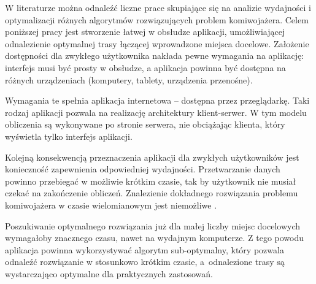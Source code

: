 W literaturze można odnaleźć liczne prace skupiające się na analizie wydajności i optymalizacji różnych algorytmów rozwiązujących problem komiwojażera. Celem poniższej pracy jest stworzenie łatwej w obsłudze aplikacji, umożliwiającej odnalezienie optymalnej trasy łączącej wprowadzone miejsca docelowe. Założenie dostępności dla zwykłego użytkownika nakłada pewne wymagania na aplikację: interfejs musi być prosty w obsłudze, a aplikacja powinna być dostępna na różnych urządzeniach (komputery, tablety, urządzenia przenośne).

Wymagania te spełnia aplikacja internetowa -- dostępna przez przeglądarkę. Taki rodzaj aplikacji pozwala na realizację architektury klient-serwer. W tym modelu obliczenia są wykonywane po stronie serwera, nie obciążając klienta, który wyświetla tylko interfejs aplikacji.

Kolejną konsekwencją przeznaczenia aplikacji dla zwykłych użytkowników jest konieczność zapewnienia odpowiedniej wydajności. Przetwarzanie danych powinno przebiegać w możliwie krótkim czasie, tak by użytkownik nie musiał czekać na zakończenie obliczeń. Znalezienie dokładnego rozwiązania problemu komiwojażera w czasie wielomianowym jest niemożliwe \cite{papadimitriou1977euclidean}.

Poszukiwanie optymalnego rozwiązania już dla małej liczby miejsc docelowych wymagałoby znacznego czasu, nawet na wydajnym komputerze. Z tego powodu aplikacja powinna wykorzystywać algorytm sub-optymalny, który pozwala odnaleźć rozwiązanie w stosunkowo krótkim czasie, a~odnalezione trasy są wystarczająco optymalne dla praktycznych zastosowań.

